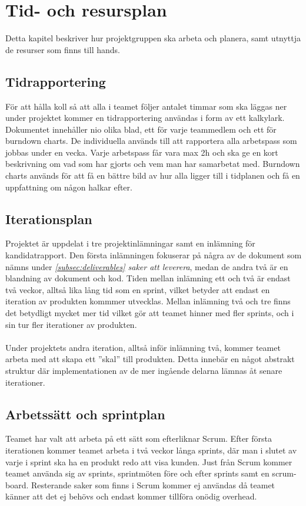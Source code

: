 \section{Tid- och resursplan}
Detta kapitel beskriver hur projektgruppen ska arbeta och planera, samt utnyttja de resurser som finns till hands.

\subsection{Tidrapportering}
För att hålla koll så att alla i teamet följer antalet timmar som ska läggas ner under
projektet kommer en tidrapportering\cite{bib-tidsrapportering} användas i form av ett 
kalkylark. Dokumentet innehåller nio olika blad, ett för varje teammedlem och ett för 
burndown charts. De individuella används till att rapportera alla arbetspass som jobbas under 
en vecka. Varje arbetspass får vara max 2h och ska ge en kort beskrivning om vad som har gjorts 
och vem man har samarbetat med. Burndown charts används för att få en bättre bild av hur alla
ligger till i tidplanen och få en uppfattning om någon halkar efter.


\subsection{Iterationsplan}
Projektet är uppdelat i tre projektinlämningar samt en inlämning för kandidatrapport. Den första inlämningen fokuserar
på några av de dokument som nämns under \textit{\ref{subsec:deliverables} saker att leverera}, medan de andra två är en blandning av dokument och kod. Tiden mellan inlämning ett och två är endast två veckor, alltså lika lång tid som en sprint, vilket betyder att endast en iteration av produkten kommmer utvecklas. Mellan inlämning två och tre finns det betydligt mycket mer tid vilket gör att teamet hinner med fler sprints, och i sin tur fler iterationer av produkten.\\
\\
Under projektets andra iteration, alltså inför inlämning två, kommer teamet arbeta med att skapa ett ''skal'' till produkten. Detta innebär en något abstrakt struktur där implementationen av de mer ingående delarna lämnas åt senare iterationer.

\subsection{Arbetssätt och sprintplan}

Teamet har valt att arbeta på ett sätt som efterliknar Scrum\cite{bib-scrum}. Efter första iterationen kommer teamet arbeta i två veckor långa sprints, där man i slutet av varje i sprint ska ha en produkt redo att visa kunden. Just från Scrum kommer teamet använda sig av sprints, sprintmöten före och efter sprints samt en scrum-board. Resterande saker som finns i Scrum kommer ej användas då teamet känner att det ej behövs och endast kommer tillföra onödig overhead.\\
\\

